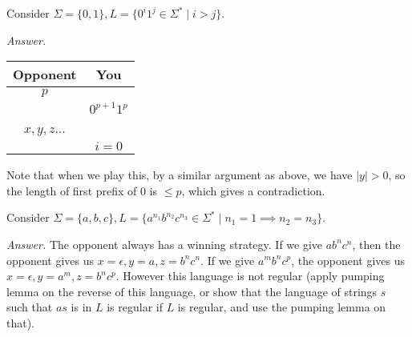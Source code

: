 \documentclass[a4paper]{article}
\newenvironment{ans}{\begin{breakbox}\textit{Answer.}}{\end{breakbox}}
\begin{document}
\begin{eg}
    Consider $\Sigma = \{0, 1\}, L = \{0^i1^j \in \Sigma^* \mid i > j\}$.
\end{eg}
\begin{ans}
    \begin{center}
        \begin{tabular}{|c|c|}
            \hline
            Opponent & You \\
            \hline
            $p$  &  \\
                 & $0^{p+1}1^p$ \\
            $x, y, z$...  &  \\
                          & $i = 0$ \\
                          \hline
        \end{tabular}
    \end{center}
    Note that when we play this, by a similar argument as above, we have $|y| > 0$, so the length of first prefix of $0$ is $\le p$, which gives a contradiction.
\end{ans}

\begin{eg}
    Consider $\Sigma = \{a, b, c\}, L = \{a^{n_1}b^{n_2}c^{n_3} \in \Sigma^* \mid n_1 = 1 \implies n_2 = n_3\}$.
\end{eg}
\begin{ans}
    The opponent always has a winning strategy. If we give $ab^nc^n$, then the opponent gives us $x = \epsilon, y = a, z = b^nc^n$.
    If we give $a^m b^n c^p$, the opponent gives us $x = \epsilon, y = a^m, z = b^n c^p$. However this language is not regular (apply pumping lemma on the reverse of this language, or show that the
    language of strings $s$ such that  $as$ is in $L$ is regular if $L$ is regular, and use the pumping lemma on that).
\end{ans}
\end{document}
